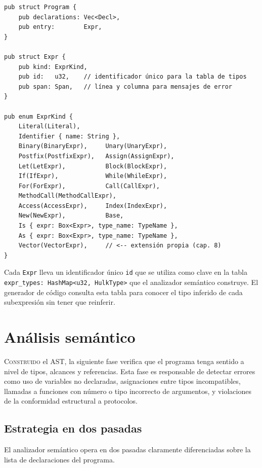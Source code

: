 \documentclass[11pt,a4paper,oneside,openany]{report}
\newcommand{\code}[1]{\texttt{#1}}
\begin{document}
\begin{lstlisting}[style=rustst, caption={Estructura central del AST.},
  label={lst:ast}]
pub struct Program {
    pub declarations: Vec<Decl>,
    pub entry:        Expr,
}

pub struct Expr {
    pub kind: ExprKind,
    pub id:   u32,    // identificador único para la tabla de tipos
    pub span: Span,   // línea y columna para mensajes de error
}

pub enum ExprKind {
    Literal(Literal),
    Identifier { name: String },
    Binary(BinaryExpr),     Unary(UnaryExpr),
    Postfix(PostfixExpr),   Assign(AssignExpr),
    Let(LetExpr),           Block(BlockExpr),
    If(IfExpr),             While(WhileExpr),
    For(ForExpr),           Call(CallExpr),
    MethodCall(MethodCallExpr),
    Access(AccessExpr),     Index(IndexExpr),
    New(NewExpr),           Base,
    Is { expr: Box<Expr>, type_name: TypeName },
    As { expr: Box<Expr>, type_name: TypeName },
    Vector(VectorExpr),     // <-- extensión propia (cap. 8)
}
\end{lstlisting}

Cada \code{Expr} lleva un identificador único \code{id} que se utiliza como clave
en la tabla \code{expr\_types: HashMap<u32, HulkType>} que el analizador semántico
construye. El generador de código consulta esta tabla para conocer el tipo
inferido de cada subexpresión sin tener que reinferir.

\chapter{Análisis semántico}
\label{cap:sem}

\lettrine[lines=2,findent=2pt,nindent=0pt]{C}{onstruido} el AST, la siguiente fase
verifica que el programa tenga sentido a nivel de tipos, alcances y referencias.
Esta fase es responsable de detectar errores como uso de variables no declaradas,
asignaciones entre tipos incompatibles, llamadas a funciones con número o tipo
incorrecto de argumentos, y violaciones de la conformidad estructural a protocolos.

\section{Estrategia en dos pasadas}

El analizador semántico opera en dos pasadas claramente diferenciadas sobre la
lista de declaraciones del programa.
\end{document}
